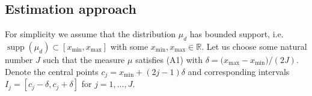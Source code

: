 \documentclass[numbers,webpdf,imaiai]{ima-authoring-template}%
\theoremstyle{thmstyletwo}%
\newcommand{\R}{\mathbb{R}}
\newcommand{\supp}{\operatorname{supp}}
\numberwithin{equation}{section}
\begin{document}
\subsection{Estimation approach}  \label{secest1}
For simplicity we assume that the distribution $\mu_d$ has bounded support, i.e. $\supp(\mu_d) \subset [x_{\min}, x_{\max}]$ with some \(x_{\min}, x_{\max} \in \R\). Let us choose some natural number \(J\) such that  the measure \(\mu\) satisfies (A1) with  \(\delta= \bigl(x_{\max} - x_{\min}\bigr)/(2 J).\) Denote the central points $c_j = x_{\min} + (2j-1)\delta$ and corresponding intervals $I_j = [c_j - \delta, c_j + \delta]$ for $j = 1, \dots, J$.
\end{document}
